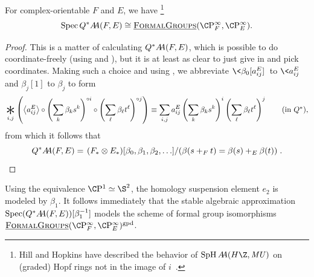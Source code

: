 \begin{corollary}
For complex-orientable \(F\) and \(E\), we have%
\footnote{%
Hill and Hopkins have described the behavior of \(\SpH \AA(H\Z, \MU)\) on (graded) Hopf rings not in the image of \(i\)~\cite[Definition 1.22]{HillHopkins}.
}
\[\Spec Q^* \AA(F, E) \cong \InternalHom{FormalGroups}(\CP^\infty_F, \CP^\infty_E).\]
\end{corollary}
\begin{proof}
This is a matter of calculating \(Q^* \AA(F, E)\), which is possible to do coordinate-freely (using  and \cite[Proposition 6.15]{StricklandFSFG}), but it is at least as clear to just give in and pick coordinates.
Making such a choice and using , we abbreviate \(\<\beta_0[a_{ij}^E]\>\) to \(\<a_{ij}^E\>\) and \(\beta_j[1]\) to \(\beta_j\) to form \[\bigast_{i, j} \left(\left\langle a_{ij}^E\right\rangle \circ \left( \sum_k \beta_k s^k \right)^{\circ i} \circ \left( \sum_\ell \beta_\ell t^\ell \right)^{\circ j} \right) \equiv \sum_{i, j} a_{ij}^E \left( \sum_k \beta_k s^k \right)^i \left( \sum_\ell \beta_\ell t^\ell \right)^j \tag{in \(Q^*\)},\] from which it follows that \[Q^* \AA(F, E) = \left. (F_* \otimes E_*)[\beta_0, \beta_1, \beta_2, \ldots] \middle/ \left( \beta(s +_F t) = \beta(s) +_E \beta(t) \right) \right. . \qedhere\]
\end{proof}

\begin{remark}
Using the equivalence \(\CP^1 \simeq \S^2\), the homology suspension element \(e_2\) is modeled by \(\beta_1\).
It follows immediately that the stable algebraic approximation \(\Spec (Q^* \AA(F, E))[\beta_1^{-1}]\) models the scheme of formal group isomorphisms \(\InternalHom{FormalGroups}(\CP^\infty_F, \CP^\infty_E)^{\mathrm{gpd}}\).
\end{remark}

